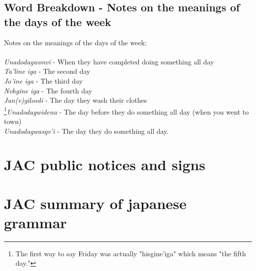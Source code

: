 \begin{multicols}
\label{sec:daysOfWeekMeaning}\section{Word Breakdown - Notes on the meanings of the days of the week}Notes on the meanings of the days of the week:\\
\cite{walc1pp46}\\

\textit{Unadodagwonvi} - When they have completed doing something all day\\
\textit{Ta’line iga} - The second day\\
\textit{Jo’ine iga} - The third day\\
\textit{Nvhgine iga} - The fourth day\\
\textit{Jun(v)gilosdi} - The day they wash their clothes\\
\footnote{The first way to say Friday was actually "hisgine'iga" which means "the fifth day."}\textit{Unadodagwidena} - The day before they do something all day (when you went to town)\\
\textit{Unadodagwasgv’i} - The day they do something all day.\\
\chapter{JAC public notices and signs}
\chapter{JAC summary of japanese grammar}
\end{multicols}